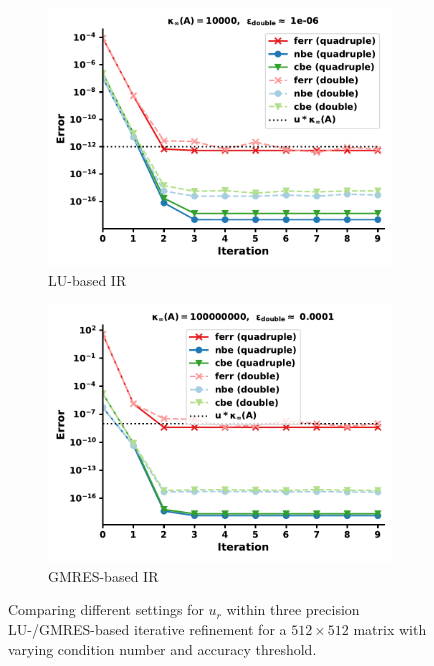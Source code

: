 \begin{figure}[h]
\centering
\begin{subfigure}{.5\textwidth}
  \centering
  \includegraphics[width=\linewidth]{chapters/5_experiments/figures/LU_high.pdf}
  \caption{LU-based IR}
  \label{fig:lu_high}
\end{subfigure}%
\begin{subfigure}{.5\textwidth}
  \centering
  \includegraphics[width=\linewidth]{chapters/5_experiments/figures/GMRES_high.pdf}
  \caption{GMRES-based IR}
  \label{fig:gmres_high}
\end{subfigure}
\caption[Mixed Precision Low-RankIR (without high precision)]{Comparing different settings for $u_r$ within three precision LU-/GMRES-based iterative refinement for a $512 \times 512$ matrix with varying condition number and accuracy threshold.}
\label{fig:lr_high}
\end{figure}

